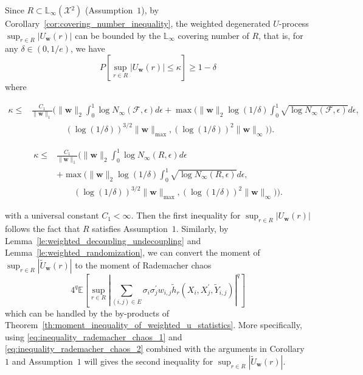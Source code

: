 \documentclass[letterpaper]{article} %
\def\DoubleColumn{}
\def\DoubleColumnEnd{}
\def\SingleColumn{}
\def\SingleColumnEnd{}
\newcommand{\E}{\mathbb{E}}
\newcommand{\Pro}{P}
\newcommand{\weight}{\mathbf{w}}
\newcommand{\xspace}{\mathcal{X}}
\newcommand{\pair}[1]{(#1)}
\newcommand{\lebesgue}{\mathbb{L}}
\newcommand{\normo}[1]{\|#1\|_1}
\begin{document}
Since $R\subset\lebesgue{}_\infty(\xspace{}^2)$ (Assumption~$1$), by Corollary~\ref{cor:covering_number_inequality}, the weighted degenerated $U$-process $\sup_{r\in R}|U_\weight{}(r)|$ can be bounded by the $\lebesgue{}_\infty$ covering number of $R$, that is, for any $\delta\in (0,1/e)$, we have
\[\Pro[\sup_{r\in R}|U_\weight{}(r)|\le \kappa]\ge 1-\delta\]
where 
\SingleColumn
\begin{align*}
    \kappa\le&\frac{C_1}{\normo{\weight}}\Bigg(\|\weight{}\|_2\int_0^{1}\log N_\infty(\mathcal F, \epsilon)d\epsilon+\max\Big(\|\weight{}\|_2\log(1/\delta)\int_0^{1}\sqrt{\log N_\infty(\mathcal F,\epsilon)}d\epsilon,\\
    &\qquad\qquad(\log(1/\delta))^{3/2}\|\weight{}\|_{\max}, (\log(1/\delta))^2\|\weight{}\|_\infty\Big)\Bigg).
\end{align*}
\SingleColumnEnd
\DoubleColumn
\begin{align*}
    \kappa\le&\frac{C_1}{\normo{\weight}}\Bigg(\|\weight{}\|_2\int_0^{1}\log N_\infty(R, \epsilon)d\epsilon\\
    &+\max\Big(\|\weight{}\|_2\log(1/\delta)\int_0^{1}\sqrt{\log N_\infty(R,\epsilon)}d\epsilon,\\
    &\qquad(\log(1/\delta))^{3/2}\|\weight{}\|_{\max},(\log(1/\delta))^2\|\weight{}\|_\infty\Big)\Bigg).
\end{align*}
\DoubleColumnEnd
with a universal constant $C_1<\infty$. 
Then the first inequality for $\sup_{r\in R}|U_\weight{}(r)|$ follows the fact that $R$ satisfies Assumption~$1$.
Similarly, by Lemma~\ref{le:weighted_decoupling_undecoupling} and Lemma~\ref{le:weighted_randomization}, we can convert the moment of $\sup_{r\in R}|\widetilde{U}_\weight{}(r)|$ to the moment of Rademacher chaos
\[4^q\E[\sup_{r\in R}|\sum_{\pair{i,j}\in E}\sigma_i\sigma_j^\prime w_{i,j}\tilde{h}_r(X_i, X_j^\prime,\tilde{Y}_{i,j})|^q]\] 
which can be handled by the by-products of Theorem~\ref{th:moment_inequality_of_weighted_u_statistics}. More specifically, using \eqref{eq:inequality_rademacher_chaos_1} and \eqref{eq:inequality_rademacher_chaos_2} combined with the arguments in Corollary~$1$ and Assumption~$1$ will gives the second inequality for $\sup_{r\in R}|\widetilde{U}_\weight{}(r)|$.

\end{document}
